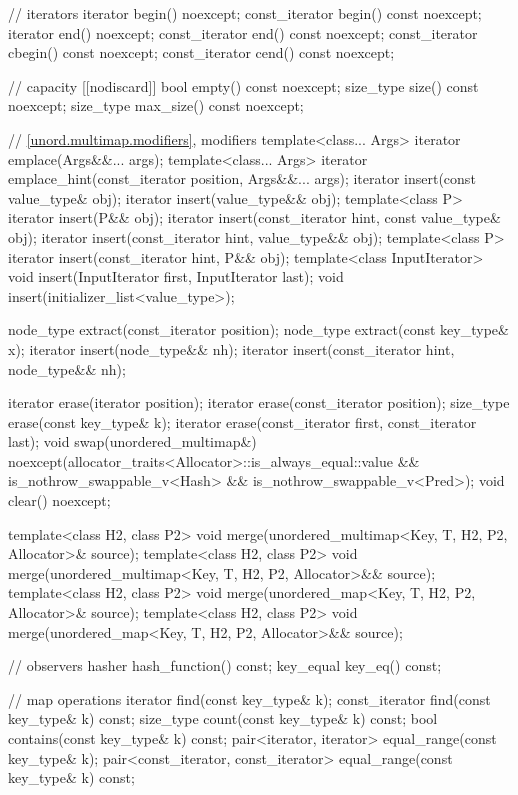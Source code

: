 \begin{codeblock}
{{    // iterators
    iterator       begin() noexcept;
    const_iterator begin() const noexcept;
    iterator       end() noexcept;
    const_iterator end() const noexcept;
    const_iterator cbegin() const noexcept;
    const_iterator cend() const noexcept;

    // capacity
    [[nodiscard]] bool empty() const noexcept;
    size_type size() const noexcept;
    size_type max_size() const noexcept;

    // \ref{unord.multimap.modifiers}, modifiers
    template<class... Args> iterator emplace(Args&&... args);
    template<class... Args> iterator emplace_hint(const_iterator position, Args&&... args);
    iterator insert(const value_type& obj);
    iterator insert(value_type&& obj);
    template<class P> iterator insert(P&& obj);
    iterator insert(const_iterator hint, const value_type& obj);
    iterator insert(const_iterator hint, value_type&& obj);
    template<class P> iterator insert(const_iterator hint, P&& obj);
    template<class InputIterator> void insert(InputIterator first, InputIterator last);
    void insert(initializer_list<value_type>);

    node_type extract(const_iterator position);
    node_type extract(const key_type& x);
    iterator insert(node_type&& nh);
    iterator insert(const_iterator hint, node_type&& nh);

    iterator  erase(iterator position);
    iterator  erase(const_iterator position);
    size_type erase(const key_type& k);
    iterator  erase(const_iterator first, const_iterator last);
    void      swap(unordered_multimap&)
      noexcept(allocator_traits<Allocator>::is_always_equal::value &&
               is_nothrow_swappable_v<Hash> &&
               is_nothrow_swappable_v<Pred>);
    void      clear() noexcept;

    template<class H2, class P2>
      void merge(unordered_multimap<Key, T, H2, P2, Allocator>& source);
    template<class H2, class P2>
      void merge(unordered_multimap<Key, T, H2, P2, Allocator>&& source);
    template<class H2, class P2>
      void merge(unordered_map<Key, T, H2, P2, Allocator>& source);
    template<class H2, class P2>
      void merge(unordered_map<Key, T, H2, P2, Allocator>&& source);

    // observers
    hasher hash_function() const;
    key_equal key_eq() const;

    // map operations
    iterator       find(const key_type& k);
    const_iterator find(const key_type& k) const;
    size_type      count(const key_type& k) const;
    bool           contains(const key_type& k) const;
    pair<iterator, iterator>             equal_range(const key_type& k);
    pair<const_iterator, const_iterator> equal_range(const key_type& k) const;

}}
\end{codeblock}
